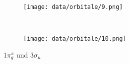 \documentclass[12pt]{article}
\begin{document}
\begin{onehalfspace}
\begin{figure}[!hptb]
    \centering
    \begin{subfigure}[b]{0.4\textwidth}
        \texttt{[image: data/orbitale/9.png]}
    \end{subfigure}
    ~ %
    \begin{subfigure}[b]{0.4\textwidth}
        \texttt{[image: data/orbitale/10.png]}
    \end{subfigure}
    \caption{$1 \pi _g^x$   und $3 \sigma _u$}
\end{figure}

\end{onehalfspace}
\end{document}
